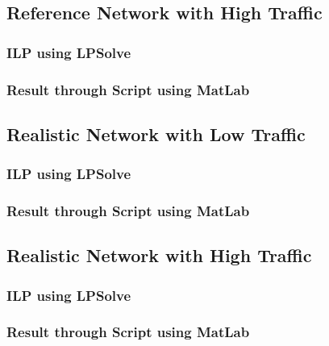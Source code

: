 \subsection{Reference Network with High Traffic}

\subsubsection{ILP using LPSolve}

\subsubsection{Result through Script using MatLab}


\subsection{Realistic Network with Low Traffic}

\subsubsection{ILP using LPSolve}

\subsubsection{Result through Script using MatLab}


\subsection{Realistic Network with High Traffic}

\subsubsection{ILP using LPSolve}

\subsubsection{Result through Script using MatLab}

